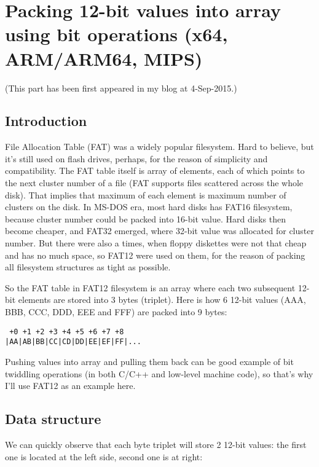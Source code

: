 \section[Packing 12-bit values into array]{Packing 12-bit values into array using bit operations (x64, ARM/ARM64, MIPS)}

(This part has been first appeared in my blog at 4-Sep-2015.)

\subsection{Introduction}

File Allocation Table (FAT) was a widely popular filesystem.
Hard to believe, but it's still used on flash drives, perhaps, for the reason of simplicity and compatibility.
The FAT table itself is array of elements, each of which points to the next cluster number of a file 
(FAT supports files scattered across the whole disk).
That implies that maximum of each element is maximum number of clusters on the disk.
In MS-DOS era, most hard disks has FAT16 filesystem, because cluster number could be packed into 16-bit value.
Hard disks then become cheaper, and FAT32 emerged, where 32-bit value was allocated for cluster number.
But there were also a times, when floppy diskettes were not that cheap and has no much space, so FAT12 were used on them,
for the reason of packing all filesystem structures as tight as possible.

So the FAT table in FAT12 filesystem is an array where each two subsequent 12-bit elements are stored into 3 bytes (triplet).
Here is how 6 12-bit values (AAA, BBB, CCC, DDD, EEE and FFF) are packed into 9 bytes:

\begin{lstlisting}
 +0 +1 +2 +3 +4 +5 +6 +7 +8
|AA|AB|BB|CC|CD|DD|EE|EF|FF|...
\end{lstlisting}

Pushing values into array and pulling them back can be good example of bit twiddling operations (in both C/C++ and low-level machine code),
so that's why I'll use FAT12 as an example here.

\subsection{Data structure}

We can quickly observe that each byte triplet will store 2 12-bit values: the first one is located at the left side, second one is at right:

